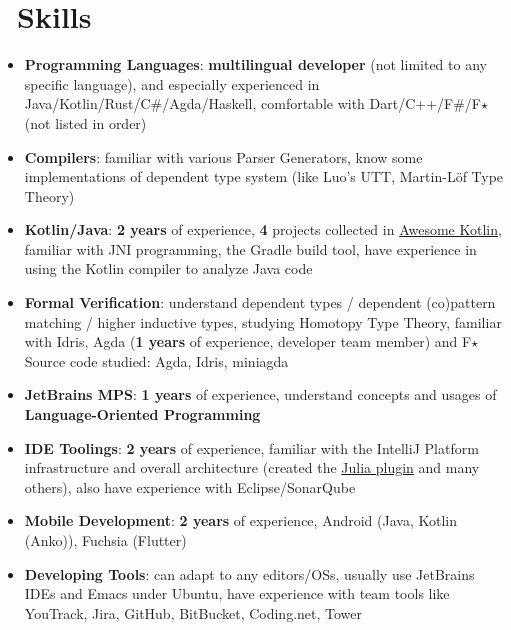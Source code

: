 \documentclass{resume}
\begin{document}
\section{\faCogs\ Skills}
\begin{itemize}[parsep=0.25ex]
  \item \textbf{Programming Languages}:
    \textbf{multilingual developer} (not limited to any specific language),
    and especially experienced in Java/Kotlin/Rust/C\#/Agda/Haskell,
    comfortable with Dart/C++/F\#/F$\star$ (not listed in order)

  \item \textbf{Compilers}:
    familiar with various Parser Generators, know some implementations of dependent
    type system (like Luo's UTT, Martin-Löf Type Theory)

  \item \textbf{Kotlin/Java}:
    \textbf{2 years} of experience,
    \textbf{4} projects collected in
    \href{https://kotlin.link/?q=ice} {Awesome Kotlin},
    familiar with JNI programming, the Gradle build tool, have experience
    in using the Kotlin compiler to analyze Java code

  \item \textbf{Formal Verification}:
    understand dependent types / dependent (co)pattern matching /
    higher inductive types, studying Homotopy Type Theory,
    familiar with Idris, Agda (\textbf{1 years} of experience,
    developer team member) and F$\star$
    \subitem Source code studied: Agda, Idris, miniagda

  \item \textbf{JetBrains MPS}:
    \textbf{1 years} of experience,
    understand concepts and usages of \textbf{Language-Oriented Programming}

  \item \textbf{IDE Toolings}:
    \textbf{2 years} of experience,
    familiar with the IntelliJ Platform infrastructure and overall
    architecture (created the
    \href{https://plugins.jetbrains.com/plugin/10413-julia}
         {Julia plugin} and many others), also have experience with Eclipse/SonarQube

  \item \textbf{Mobile Development}:
    \textbf{2 years} of experience,
    Android (Java, Kotlin (Anko)), Fuchsia (Flutter)

  \item \textbf{Developing Tools}:
    can adapt to any editors/OSs, usually use JetBrains IDEs and Emacs under Ubuntu,
    have experience with team tools like YouTrack, Jira, GitHub, BitBucket, Coding.net, Tower
\end{itemize}
\end{document}
